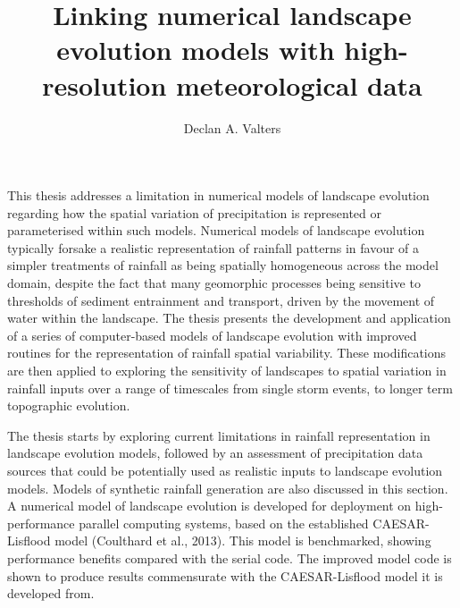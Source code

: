 \title{Linking numerical landscape evolution models with high-resolution meteorological data}

\author{Declan A. Valters}
\def\wordcount{xxxxx}




\beforeabstract
This thesis addresses a limitation in numerical models of landscape evolution regarding how the spatial variation of precipitation is represented or parameterised within such models. Numerical models of landscape evolution typically forsake a realistic representation of rainfall patterns in favour of a simpler treatments of rainfall as being spatially homogeneous across the model domain, despite the fact that many geomorphic processes being sensitive to thresholds of sediment entrainment and transport, driven by the movement of water within the landscape. The thesis presents the development and application of a series of computer-based models of landscape evolution with improved routines for the representation of rainfall spatial variability. These modifications are then applied to exploring the sensitivity of landscapes to spatial variation in rainfall inputs over a range of timescales from single storm events, to longer term topographic evolution. 

The thesis starts by exploring current limitations in rainfall representation in landscape evolution models, followed by an assessment of precipitation data sources that could be potentially used as realistic inputs to landscape evolution models. Models of synthetic rainfall generation are also discussed in this section. A numerical model of landscape evolution is developed for deployment on high-performance parallel computing systems, based on the established CAESAR-Lisflood model (Coulthard et al., 2013). This model is benchmarked, showing performance benefits compared with the serial code. The improved model code is shown to produce results commensurate with the CAESAR-Lisflood model it is developed from.


